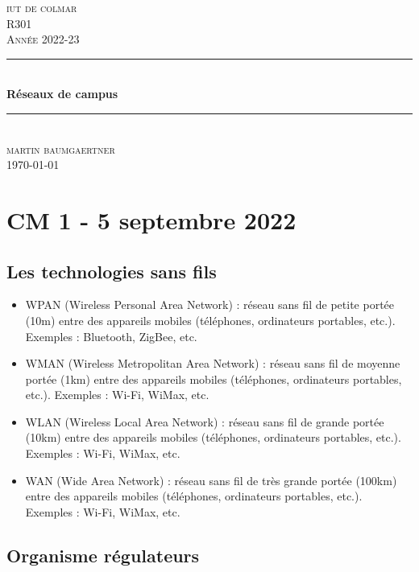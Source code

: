 \documentclass[12pt, a4paper]{article}
\begin{document}
\begin{titlepage}
	\newcommand{\HRule}{\rule{\linewidth}{0.5mm}} 
	\center 
	\textsc{\LARGE iut de colmar}\\[1.5cm] 
	\textsc{\Large R301}\\[0.5cm] 
	\textsc{\large Année 2022-23}\\[0.5cm]
	\HRule\\[0.75cm]
	{\huge\bfseries Réseaux de campus}\\[0.4cm]
	\HRule\\[1.5cm]
	\textsc{\large martin baumgaertner}\\[0.5cm] 

	\vfill\vfill\vfill
	{\large\today} 
	\vfill
\end{titlepage}
\newpage
\tableofcontents
\newpage
\section{CM 1 - 5 septembre 2022}
\subsection{Les technologies sans fils}
\begin{itemize}
    \item WPAN (Wireless Personal Area Network) : réseau sans fil de petite portée (10m) entre des appareils mobiles (téléphones, ordinateurs portables, etc.). Exemples : Bluetooth, ZigBee, etc.\\
    \item WMAN (Wireless Metropolitan Area Network) : réseau sans fil de moyenne portée (1km) entre des appareils mobiles (téléphones, ordinateurs portables, etc.). Exemples : Wi-Fi, WiMax, etc.\\
    \item WLAN (Wireless Local Area Network) : réseau sans fil de grande portée (10km) entre des appareils mobiles (téléphones, ordinateurs portables, etc.). Exemples : Wi-Fi, WiMax, etc.\\
    \item WAN (Wide Area Network) : réseau sans fil de très grande portée (100km) entre des appareils mobiles (téléphones, ordinateurs portables, etc.). Exemples : Wi-Fi, WiMax, etc.\\
\end{itemize}

\subsection{Organisme régulateurs}
\end{document}
